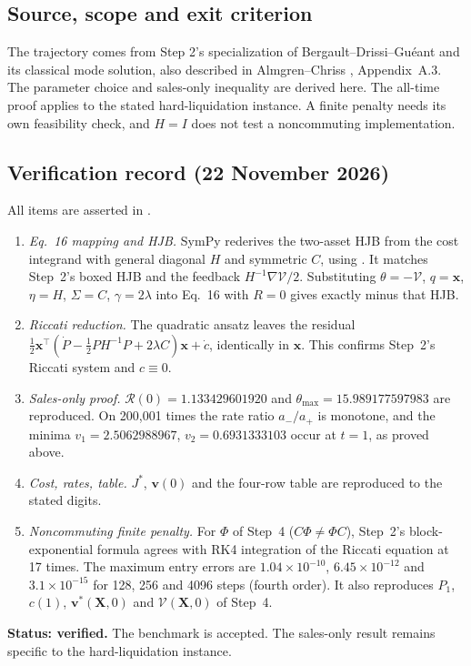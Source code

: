 \documentclass[11pt,a4paper]{article}
\begin{document}
\subsection*{Source, scope and exit criterion}

The trajectory comes from Step 2's specialization of
Bergault--Drissi--Gu\'eant \cite{bergault2022} and its classical
mode solution, also described in Almgren--Chriss
\cite{almgrenchriss2000}, Appendix~A.3. The parameter choice and sales-only
inequality are derived here. The all-time proof applies to the stated
hard-liquidation instance. A finite penalty needs its own feasibility check,
and $H=I$ does not test a noncommuting implementation.

\subsection*{Verification record (22 November 2026)}

All items are asserted in .
\begin{enumerate}
\item \emph{Eq.~16 mapping and HJB.} SymPy rederives the two-asset HJB
from the cost integrand with general diagonal $H$ and symmetric $C$, using
. It matches Step~2's boxed HJB and the
feedback $H^{-1}\nabla\mathcal V/2$. Substituting $\theta=-\mathcal V$,
$q=\mathbf x$, $\eta=H$, $\Sigma=C$, $\gamma=2\lambda$ into Eq.~16 with
$R=0$ gives exactly minus that HJB.
\item \emph{Riccati reduction.} The quadratic ansatz leaves the residual
$\tfrac12\mathbf x^\top(\dot P-\tfrac12PH^{-1}P+2\lambda C)\mathbf x+\dot c$,
identically in $\mathbf x$. This confirms Step~2's Riccati system and $c\equiv0$.
\item \emph{Sales-only proof.} $\mathcal R(0)=1.133429601920$ and
$\theta_{\max}=15.989177597983$ are reproduced. On 200{,}001 times the rate
ratio $a_-/a_+$ is monotone, and the minima
$v_1=2.5062988967$, $v_2=0.6931333103$ occur at $t=1$, as proved above.
\item \emph{Cost, rates, table.} $J^*$, $\mathbf v(0)$ and the four-row
table are reproduced to the stated digits.
\item \emph{Noncommuting finite penalty.} For $\Phi$ of Step~4
($C\Phi\ne\Phi C$), Step~2's block-exponential formula agrees with RK4 integration of the Riccati
equation at 17 times. The maximum entry errors are
$1.04\times10^{-10}$, $6.45\times10^{-12}$ and $3.1\times10^{-15}$ for 128,
256 and 4096 steps (fourth order). It also reproduces $P_1$, $c(1)$,
$\mathbf v^*(\mathbf X,0)$ and $\mathcal V(\mathbf X,0)$ of Step~4.
\end{enumerate}
\textbf{Status: verified.} The benchmark is accepted. The sales-only result
remains specific to the hard-liquidation instance.
\end{document}
